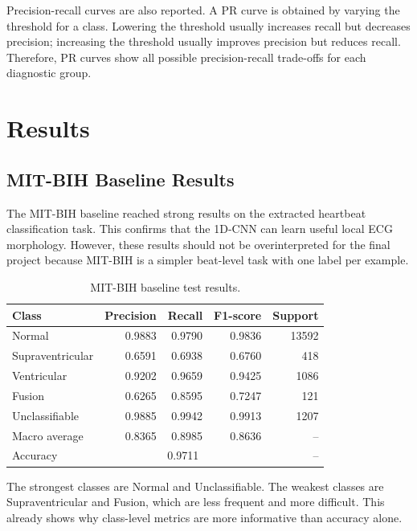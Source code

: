 \documentclass[11pt,a4paper]{article}
\begin{document}
Precision-recall curves are also reported. A PR curve is obtained by varying the threshold for a class. Lowering the threshold usually increases recall but decreases precision; increasing the threshold usually improves precision but reduces recall. Therefore, PR curves show all possible precision-recall trade-offs for each diagnostic group.

\section{Results}

\subsection{MIT-BIH Baseline Results}

The MIT-BIH baseline reached strong results on the extracted heartbeat classification task. This confirms that the 1D-CNN can learn useful local ECG morphology. However, these results should not be overinterpreted for the final project because MIT-BIH is a simpler beat-level task with one label per example.

\begin{table}[H]
\centering
\caption{MIT-BIH baseline test results.}
\begin{tabular}{lrrrr}
\toprule
\textbf{Class} & \textbf{Precision} & \textbf{Recall} & \textbf{F1-score} & \textbf{Support} \\
\midrule
Normal & 0.9883 & 0.9790 & 0.9836 & 13592 \\
Supraventricular & 0.6591 & 0.6938 & 0.6760 & 418 \\
Ventricular & 0.9202 & 0.9659 & 0.9425 & 1086 \\
Fusion & 0.6265 & 0.8595 & 0.7247 & 121 \\
Unclassifiable & 0.9885 & 0.9942 & 0.9913 & 1207 \\
\midrule
Macro average & 0.8365 & 0.8985 & 0.8636 & -- \\
Accuracy & \multicolumn{3}{c}{0.9711} & -- \\
\bottomrule
\end{tabular}
\end{table}

The strongest classes are Normal and Unclassifiable. The weakest classes are Supraventricular and Fusion, which are less frequent and more difficult. This already shows why class-level metrics are more informative than accuracy alone.
\end{document}
